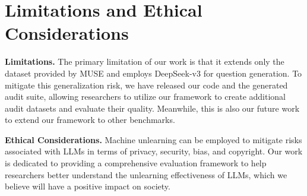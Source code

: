\section*{Limitations and Ethical Considerations}

\noindent\textbf{Limitations.} The primary limitation of our work is that it extends only the dataset provided by MUSE and employs DeepSeek-v3 for question generation. 
To mitigate this generalization risk, we have released our code and the generated audit suite, allowing researchers to utilize our framework to create additional audit datasets and evaluate their quality. Meanwhile, this is also our future work to extend our framework to other benchmarks.

\noindent\textbf{Ethical Considerations.} Machine unlearning can be employed to mitigate risks associated with LLMs in terms of privacy, security, bias, and copyright. Our work is dedicated to providing a comprehensive evaluation framework to help researchers better understand the unlearning effectiveness of LLMs, which we believe will have a positive impact on society.